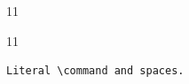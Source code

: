 \documentclass[paper=A4]{ropas-poster}
\begin{document}
\begin{postergrid}{1}{1}
\begin{posterblock}{1}{1}
\begin{verbatim}
Literal \command and spaces.
\end{verbatim}
\end{posterblock}
\end{postergrid}
\end{document}
